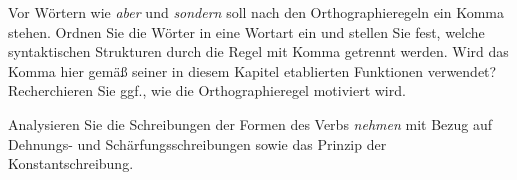  \label{exc:morphosyntaktischeschreibprinzipien03} Vor Wörtern wie \textit{aber} und \textit{sondern} soll nach den Orthographieregeln ein Komma stehen.
Ordnen Sie die Wörter in eine Wortart ein und stellen Sie fest, welche syntaktischen Strukturen durch die Regel mit Komma getrennt werden.
Wird das Komma hier gemäß seiner in diesem Kapitel etablierten Funktionen verwendet?
Recherchieren Sie ggf., wie die Orthographieregel motiviert wird.

\Uebung[\tristar]{} \label{exc:morphosyntaktischeschreibprinzipien04} Analysieren Sie die Schreibungen der Formen des Verbs \textit{nehmen} mit Bezug auf Dehnungs- und Schärfungsschreibungen sowie das Prinzip der Konstantschreibung.

